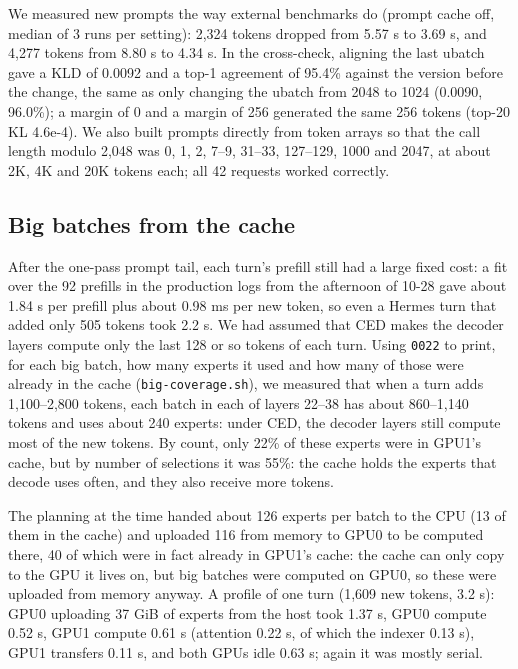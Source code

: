 \documentclass[11pt,a4paper]{article}
\newcommand{\code}[1]{\texttt{#1}}
\begin{document}
We measured new prompts the way external benchmarks do (prompt cache off, median of 3 runs per setting): 2,324 tokens dropped from 5.57 s to 3.69 s, and 4,277 tokens from 8.80 s to 4.34 s. In the cross-check, aligning the last ubatch gave a KLD of 0.0092 and a top-1 agreement of 95.4\% against the version before the change, the same as only changing the ubatch from 2048 to 1024 (0.0090, 96.0\%); a margin of 0 and a margin of 256 generated the same 256 tokens (top-20 KL 4.6e-4). We also built prompts directly from token arrays so that the call length modulo 2,048 was 0, 1, 2, 7--9, 31--33, 127--129, 1000 and 2047, at about 2K, 4K and 20K tokens each; all 42 requests worked correctly.

\subsection{Big batches from the cache}
\label{sec:bigcache}

After the one-pass prompt tail, each turn's prefill still had a large fixed cost: a fit over the 92 prefills in the production logs from the afternoon of 10-28 gave about 1.84 s per prefill plus about 0.98 ms per new token, so even a Hermes turn that added only 505 tokens took 2.2 s. We had assumed that CED makes the decoder layers compute only the last 128 or so tokens of each turn. Using \code{0022} to print, for each big batch, how many experts it used and how many of those were already in the cache (\code{big-coverage.sh}), we measured that when a turn adds 1,100--2,800 tokens, each batch in each of layers 22--38 has about 860--1,140 tokens and uses about 240 experts: under CED, the decoder layers still compute most of the new tokens. By count, only 22\% of these experts were in GPU1's cache, but by number of selections it was 55\%: the cache holds the experts that decode uses often, and they also receive more tokens.

The planning at the time handed about 126 experts per batch to the CPU (13 of them in the cache) and uploaded 116 from memory to GPU0 to be computed there, 40 of which were in fact already in GPU1's cache: the cache can only copy to the GPU it lives on, but big batches were computed on GPU0, so these were uploaded from memory anyway. A profile of one turn (1,609 new tokens, 3.2 s): GPU0 uploading 37 GiB of experts from the host took 1.37 s, GPU0 compute 0.52 s, GPU1 compute 0.61 s (attention 0.22 s, of which the indexer 0.13 s), GPU1 transfers 0.11 s, and both GPUs idle 0.63 s; again it was mostly serial.
\end{document}
